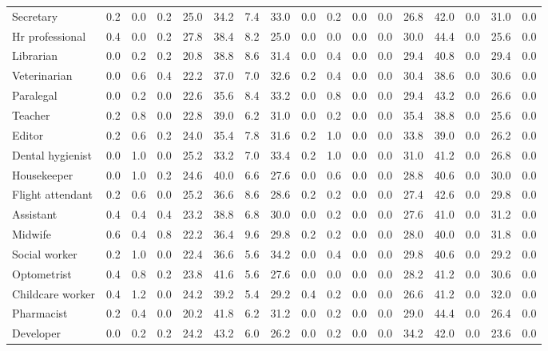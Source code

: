 \begin{table*}[p]
{\begin{tabular}{l|cccccccc|cccccccc}
Secretary
& 0.2 & 0.0 & 0.2 & 25.0 & 34.2 & 7.4 & 33.0 & 0.0 & 0.2 & 0.0 & 0.0 & 26.8 & 42.0 & 0.0 & 31.0 & 0.0 \\
Hr professional
& 0.4 & 0.0 & 0.2 & 27.8 & 38.4 & 8.2 & 25.0 & 0.0 & 0.0 & 0.0 & 0.0 & 30.0 & 44.4 & 0.0 & 25.6 & 0.0 \\
Librarian
& 0.0 & 0.2 & 0.2 & 20.8 & 38.8 & 8.6 & 31.4 & 0.0 & 0.4 & 0.0 & 0.0 & 29.4 & 40.8 & 0.0 & 29.4 & 0.0 \\
Veterinarian
& 0.0 & 0.6 & 0.4 & 22.2 & 37.0 & 7.0 & 32.6 & 0.2 & 0.4 & 0.0 & 0.0 & 30.4 & 38.6 & 0.0 & 30.6 & 0.0 \\
Paralegal
& 0.0 & 0.2 & 0.0 & 22.6 & 35.6 & 8.4 & 33.2 & 0.0 & 0.8 & 0.0 & 0.0 & 29.4 & 43.2 & 0.0 & 26.6 & 0.0 \\
Teacher
& 0.2 & 0.8 & 0.0 & 22.8 & 39.0 & 6.2 & 31.0 & 0.0 & 0.2 & 0.0 & 0.0 & 35.4 & 38.8 & 0.0 & 25.6 & 0.0 \\
Editor
& 0.2 & 0.6 & 0.2 & 24.0 & 35.4 & 7.8 & 31.6 & 0.2 & 1.0 & 0.0 & 0.0 & 33.8 & 39.0 & 0.0 & 26.2 & 0.0 \\
Dental hygienist
& 0.0 & 1.0 & 0.0 & 25.2 & 33.2 & 7.0 & 33.4 & 0.2 & 1.0 & 0.0 & 0.0 & 31.0 & 41.2 & 0.0 & 26.8 & 0.0 \\
Housekeeper
& 0.0 & 1.0 & 0.2 & 24.6 & 40.0 & 6.6 & 27.6 & 0.0 & 0.6 & 0.0 & 0.0 & 28.8 & 40.6 & 0.0 & 30.0 & 0.0 \\
Flight attendant
& 0.2 & 0.6 & 0.0 & 25.2 & 36.6 & 8.6 & 28.6 & 0.2 & 0.2 & 0.0 & 0.0 & 27.4 & 42.6 & 0.0 & 29.8 & 0.0 \\
Assistant
& 0.4 & 0.4 & 0.4 & 23.2 & 38.8 & 6.8 & 30.0 & 0.0 & 0.2 & 0.0 & 0.0 & 27.6 & 41.0 & 0.0 & 31.2 & 0.0 \\
Midwife
& 0.6 & 0.4 & 0.8 & 22.2 & 36.4 & 9.6 & 29.8 & 0.2 & 0.2 & 0.0 & 0.0 & 28.0 & 40.0 & 0.0 & 31.8 & 0.0 \\
Social worker
& 0.2 & 1.0 & 0.0 & 22.4 & 36.6 & 5.6 & 34.2 & 0.0 & 0.4 & 0.0 & 0.0 & 29.8 & 40.6 & 0.0 & 29.2 & 0.0 \\
Optometrist
& 0.4 & 0.8 & 0.2 & 23.8 & 41.6 & 5.6 & 27.6 & 0.0 & 0.0 & 0.0 & 0.0 & 28.2 & 41.2 & 0.0 & 30.6 & 0.0 \\
Childcare worker
& 0.4 & 1.2 & 0.0 & 24.2 & 39.2 & 5.4 & 29.2 & 0.4 & 0.2 & 0.0 & 0.0 & 26.6 & 41.2 & 0.0 & 32.0 & 0.0 \\
Pharmacist
& 0.2 & 0.4 & 0.0 & 20.2 & 41.8 & 6.2 & 31.2 & 0.0 & 0.2 & 0.0 & 0.0 & 29.0 & 44.4 & 0.0 & 26.4 & 0.0 \\
Developer
& 0.0 & 0.2 & 0.2 & 24.2 & 43.2 & 6.0 & 26.2 & 0.0 & 0.2 & 0.0 & 0.0 & 34.2 & 42.0 & 0.0 & 23.6 & 0.0 \\

\end{tabular}}
\end{table*}
